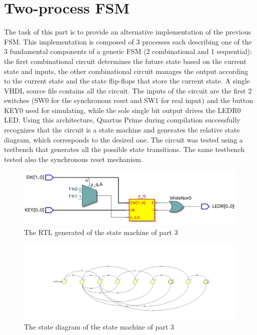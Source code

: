 \documentclass[12pt]{article}
\begin{document}
\section{Two-process FSM}
The task of this part is to provide an alternative implementation of the previous FSM. This implementation is composed of 3 processes each describing one of the 3 fundamental components of a generic FSM (2 combinational and 1 sequential): the first combinational circuit determines the future state based on the current state and inputs, the other combinational circuit manages the output according to the current state and the state flip-flops that store the current state. \newline
A single VHDL source file contains all the circuit. The inputs of the circuit are the first 2 switches (SW0 for the synchronous reset and SW1 for real input) and the button KEY0 used for simulating, while the sole single bit output drives the LEDR0 LED.
Using this architecture, Quartus Prime during compilation successfully recognizes that the circuit is a state machine and generates the relative state diagram, which corresponds to the desired one. \newline
The circuit was tested using a testbench that generates all the possible state transitions. The same testbench tested also the synchronous reset mechanism.
\begin{figure}[h]
	\centering
	\includegraphics[scale = 0.45]{immagini/AndreaMattei/RTL5_3.jpg}
	\caption{The RTL generated of the state machine of part 3}
\end{figure}
\begin{figure}[h]
	\centering
	\includegraphics[scale = 0.45]{immagini/AndreaMattei/state_machine_5_3.jpg}
	\caption{The state diagram of the state machine of part 3}
\end{figure}
\newpage
\end{document}
